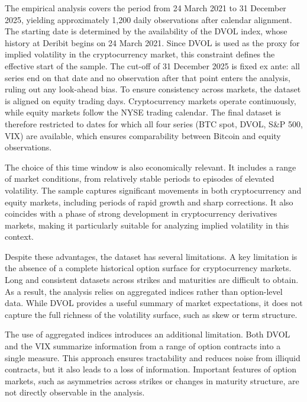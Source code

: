 \documentclass[11pt,a4paper,openany]{report}
\begin{document}
The empirical analysis covers the period from 24 March 2021 to 31
December 2025, yielding approximately 1{,}200 daily observations after
calendar alignment. The starting date is determined by the availability
of the DVOL index, whose history at Deribit begins on 24 March 2021.
Since DVOL is used as the proxy for implied volatility in the
cryptocurrency market, this constraint defines the effective start of
the sample. The cut-off of 31 December 2025 is fixed ex ante: all series
end on that date and no observation after that point enters the
analysis, ruling out any look-ahead bias. To ensure consistency across
markets, the dataset is aligned on equity trading days. Cryptocurrency
markets operate continuously, while equity markets follow the NYSE
trading calendar. The final dataset is therefore restricted to dates for
which all four series (BTC spot, DVOL, S\&P 500, VIX) are available,
which ensures comparability between Bitcoin and equity observations.

The choice of this time window is also economically relevant. It
includes a range of market conditions, from relatively stable periods to
episodes of elevated volatility. The sample captures significant
movements in both cryptocurrency and equity markets, including periods
of rapid growth and sharp corrections. It also coincides with a phase of
strong development in cryptocurrency derivatives markets, making it
particularly suitable for analyzing implied volatility in this context.

Despite these advantages, the dataset has several limitations. A key
limitation is the absence of a complete historical option surface for
cryptocurrency markets. Long and consistent datasets across strikes and
maturities are difficult to obtain. As a result, the analysis relies on
aggregated indices rather than option-level data. While DVOL provides a
useful summary of market expectations, it does not capture the full
richness of the volatility surface, such as skew or term structure.

The use of aggregated indices introduces an additional limitation. Both
DVOL and the VIX summarize information from a range of option contracts
into a single measure. This approach ensures tractability and reduces
noise from illiquid contracts, but it also leads to a loss of
information. Important features of option markets, such as asymmetries
across strikes or changes in maturity structure, are not directly
observable in the analysis.
\end{document}

